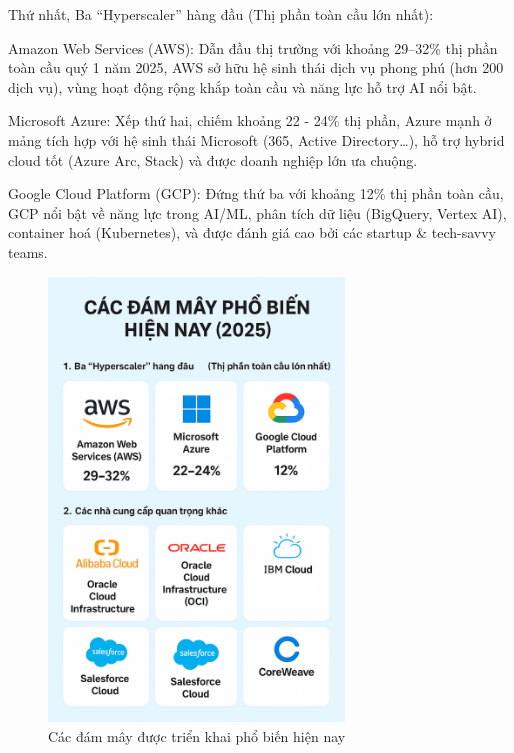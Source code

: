 \begin{myitem}
\item Thứ nhất, Ba “Hyperscaler” hàng đầu (Thị phần toàn cầu lớn nhất):
  \begin{mysubitem}
  \item Amazon Web Services (AWS): Dẫn đầu thị trường với khoảng 29--32\% thị phần toàn cầu quý 1 năm 2025, AWS sở hữu hệ sinh thái dịch vụ phong phú (hơn 200 dịch vụ), vùng hoạt động rộng khắp toàn cầu và năng lực hỗ trợ AI nổi bật.
  
  \item Microsoft Azure: Xếp thứ hai, chiếm khoảng 22 - 24\% thị phần, Azure mạnh ở mảng tích hợp với hệ sinh thái Microsoft (365, Active Directory\ldots), hỗ trợ hybrid cloud tốt (Azure Arc, Stack) và được doanh nghiệp lớn ưa chuộng.
  
  \item Google Cloud Platform (GCP): Đứng thứ ba với khoảng 12\% thị phần toàn cầu, GCP nổi bật về năng lực trong AI/ML, phân tích dữ liệu (BigQuery, Vertex AI), container hoá (Kubernetes), và được đánh giá cao bởi các startup \& tech-savvy teams.
  \end{mysubitem}

\begin{figure}[H] %
    \centering
    \includegraphics[width=0.7\textwidth]{Tong_quan_DTDM/Cac_dam_may_pho_bien.png}
    \caption{Các đám mây được triển khai phổ biến hiện nay}
    \label{fig:cloud_intro}
\end{figure}



\end{myitem}
